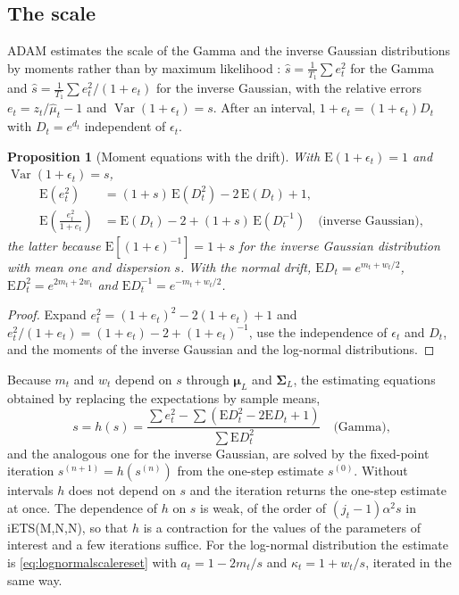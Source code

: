 \documentclass[11pt,a4paper]{article}
\newcommand{\E}{\mathrm{E}}
\DeclareMathOperator{\Var}{Var}
\newtheorem{proposition}{Proposition}
\theoremstyle{remark}
\begin{document}
\subsection{The scale}

ADAM estimates the scale of the Gamma and the inverse Gaussian distributions by moments rather than
by maximum likelihood \citep{ADAM}: $\hat s = \frac{1}{T_1}\sum e_t^2$ for the Gamma
and $\hat s = \frac{1}{T_1}\sum e_t^2/(1+e_t)$ for the inverse Gaussian, with the relative errors
$e_t = z_t/\hat\mu_t - 1$ and $\Var(1+\epsilon_t) = s$. After an interval,
$1 + e_t = (1+\epsilon_t)D_t$ with $D_t = e^{d_t}$ independent of $\epsilon_t$.

\begin{proposition}[Moment equations with the drift]
\label{prop:moments}
With $\E(1+\epsilon_t) = 1$ and $\Var(1+\epsilon_t) = s$,
\begin{align*}
\E(e_t^2) &= (1+s)\,\E(D_t^2) - 2\,\E(D_t) + 1,\\
\E\!\left(\frac{e_t^2}{1+e_t}\right) &= \E(D_t) - 2 + (1+s)\,\E(D_t^{-1})
\quad\text{(inverse Gaussian)},
\end{align*}
the latter because $\E[(1+\epsilon)^{-1}] = 1 + s$ for the inverse Gaussian distribution with mean
one and dispersion $s$. With the normal drift, $\E D_t = e^{m_t + w_t/2}$, $\E D_t^2 = e^{2m_t+2w_t}$
and $\E D_t^{-1} = e^{-m_t + w_t/2}$.
\end{proposition}

\begin{proof}
Expand $e_t^2 = (1+e_t)^2 - 2(1+e_t) + 1$ and $e_t^2/(1+e_t) = (1+e_t) - 2 + (1+e_t)^{-1}$, use the
independence of $\epsilon_t$ and $D_t$, and the moments of the inverse Gaussian and the log-normal
distributions.
\end{proof}

Because $m_t$ and $w_t$ depend on $s$ through $\boldsymbol\mu_L$ and $\boldsymbol\Sigma_L$, the
estimating equations obtained by replacing the expectations by sample means,
\begin{equation}
s = h(s) = \frac{\sum e_t^2 - \sum\left(\E D_t^2 - 2\E D_t + 1\right)}{\sum\E D_t^2}
\quad\text{(Gamma)},
\label{eq:fixedpoint}
\end{equation}
and the analogous one for the inverse Gaussian, are solved by the fixed-point iteration
$s^{(n+1)} = h(s^{(n)})$ from the one-step estimate $s^{(0)}$. Without intervals $h$ does not depend
on $s$ and the iteration returns the one-step estimate at once. The dependence of $h$ on $s$ is weak,
of the order of $(j_t - 1)\alpha^2 s$ in iETS(M,N,N), so that $h$ is a contraction for the values of
the parameters of interest and a few iterations suffice. For the log-normal distribution the
estimate is \eqref{eq:lognormalscalereset} with $a_t = 1 - 2m_t/s$ and $\kappa_t = 1 + w_t/s$,
iterated in the same way.
\end{document}
